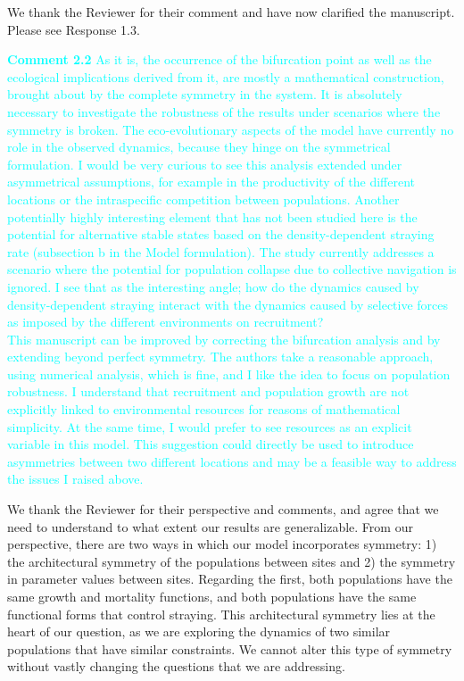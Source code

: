 \documentclass[ucm,12pt]{ucletter}
\newcounter{section}
\newcounter{subsection}[section]
\begin{document}
\begin{letter}
 We thank the Reviewer for their comment and have now clarified the manuscript. Please see Response 1.3.

\noindent \textcolor{cyan}{
{\bf Comment 2.2} As it is, the occurrence of the bifurcation point as well as the ecological implications derived from it, are mostly a mathematical construction, brought about by the complete symmetry in the system. It is absolutely necessary to investigate the robustness of the results under scenarios where the symmetry is broken. The eco-evolutionary aspects of the model have currently no role in the observed dynamics, because they hinge on the symmetrical formulation.
I would be very curious to see this analysis extended under asymmetrical assumptions, for example in the productivity of the different locations or the intraspecific competition between populations. Another potentially highly interesting element that has not been studied here is the potential for alternative stable states based on the density-dependent straying rate (subsection b in the Model formulation). The study currently addresses a scenario where the potential for population collapse due to collective navigation is ignored. I see that as the interesting angle; how do the dynamics caused by density-dependent straying interact with the dynamics caused by selective forces as imposed by the different environments on recruitment?
\\
This manuscript can be improved by correcting the bifurcation analysis and by extending beyond perfect symmetry. The authors take a reasonable approach, using numerical analysis, which is fine, and I like the idea to focus on population robustness.  I understand that recruitment and population growth are not explicitly linked to environmental resources for reasons of mathematical simplicity. At the same time, I would prefer to see resources as an explicit variable in this model. This suggestion could directly be used to introduce asymmetries between two different locations and may be a feasible way to address the issues I raised above.
}

 We thank the Reviewer for their perspective and comments, and agree that we need to understand to what extent our results are generalizable.
From our perspective, there are two ways in which our model incorporates symmetry: 1) the architectural symmetry of the populations between sites and 2) the symmetry in parameter values between sites. Regarding the first, both populations have the same growth and mortality functions, and both populations have the same functional forms that control straying. This architectural symmetry lies at the heart of our question, as we are exploring the dynamics of two similar populations that have similar constraints. We cannot alter this type of symmetry without vastly changing the questions that we are addressing.


\end{letter}
\end{document}

